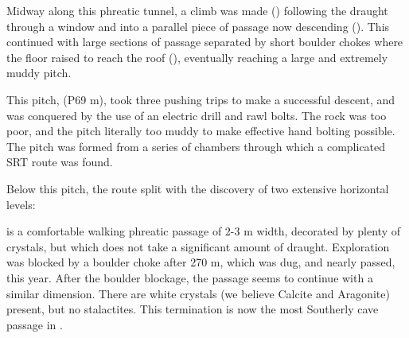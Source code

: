 Midway along this phreatic tunnel, a climb was made ()
following the draught through a window and into a parallel piece of
passage now descending (). This continued with large
sections of passage separated by short boulder chokes where the floor
raised to reach the roof (), eventually reaching a
large and extremely muddy pitch.

This pitch,  (P69 m), took three pushing trips
to make a successful descent, and was conquered by the use of an
electric drill and rawl bolts. The rock was too poor, and the pitch
literally too muddy to make effective hand bolting possible. The pitch
was formed from a series of chambers through which a complicated SRT
route was found.

Below this pitch, the route split with the discovery of two extensive
horizontal levels:

 is a comfortable
walking phreatic passage of 2-3 m width, decorated by plenty of
crystals, but which does not take a significant amount of draught.
Exploration was blocked by a boulder choke after 270 m, which was dug,
and nearly passed, this year. After the boulder blockage, the passage
seems to continue with a similar dimension. There are white crystals (we
believe Calcite and Aragonite) present, but no stalactites. This
termination is now the most Southerly cave passage in .

